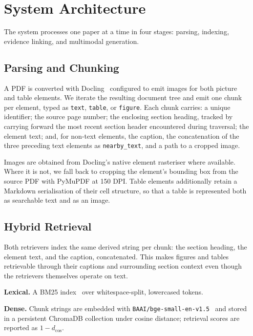 \documentclass[conference]{IEEEtran}
\begin{document}
\section{System Architecture}
\label{sec:system}

The system processes one paper at a time in four stages: parsing, indexing,
evidence linking, and multimodal generation.

\subsection{Parsing and Chunking}
A PDF is converted with Docling~\cite{docling2024} configured to emit images
for both picture and table elements. We iterate the resulting document tree and
emit one chunk per element, typed as \texttt{text}, \texttt{table}, or
\texttt{figure}. Each chunk carries: a unique identifier; the source page
number; the enclosing section heading, tracked by carrying forward the most
recent section header encountered during traversal; the element text; and, for
non-text elements, the caption, the concatenation of the three preceding text
elements as \texttt{nearby\_text}, and a path to a cropped image.

Images are obtained from Docling's native element rasteriser where available.
Where it is not, we fall back to cropping the element's bounding box from the
source PDF with PyMuPDF at 150 DPI. Table elements additionally retain a
Markdown serialisation of their cell structure, so that a table is represented
both as searchable text and as an image.

\subsection{Hybrid Retrieval}
Both retrievers index the same derived string per chunk: the section heading,
the element text, and the caption, concatenated. This makes figures and tables
retrievable through their captions and surrounding section context even though
the retrievers themselves operate on text.

\textbf{Lexical.} A BM25 index~\cite{robertson2009bm25} over whitespace-split,
lowercased tokens.

\textbf{Dense.} Chunk strings are embedded with
\texttt{BAAI/bge-small-en-v1.5}~\cite{xiao2023cpack} and stored in a persistent
ChromaDB collection under cosine distance; retrieval scores are reported as
$1 - d_{\cos}$.
\end{document}
